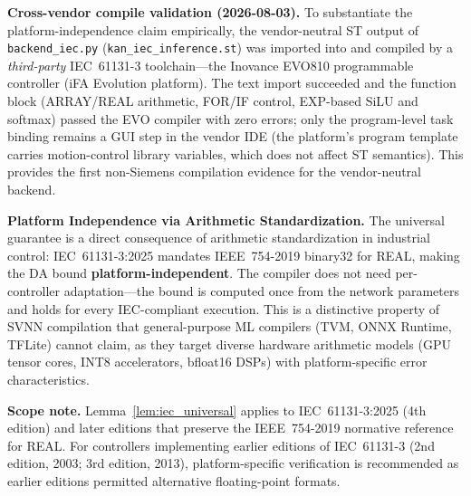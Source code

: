 \vspace{4pt}
\noindent\textbf{Cross-vendor compile validation (2026-08-03).} To
substantiate the platform-independence claim empirically, the
vendor-neutral ST output of \texttt{backend\_iec.py}
(\texttt{kan\_iec\_inference.st}) was imported into and compiled by a
\emph{third-party} IEC~61131-3 toolchain---the Inovance EVO810
programmable controller (iFA Evolution platform). The text import
succeeded and the function block (ARRAY/REAL arithmetic, FOR/IF
control, EXP-based SiLU and softmax) passed the EVO compiler with zero
errors; only the program-level task binding remains a GUI step in the
vendor IDE (the platform's program template carries motion-control
library variables, which does not affect ST semantics). This provides
the first non-Siemens compilation evidence for the vendor-neutral
backend.

\vspace{4pt}
\noindent\textbf{Platform Independence via Arithmetic Standardization.}
The universal guarantee is a direct consequence of arithmetic
standardization in industrial control: IEC~61131-3:2025 mandates
IEEE~754-2019 binary32 for REAL, making the DA bound
\textbf{platform-independent}. The compiler does not need per-controller
adaptation---the bound is computed once from the network parameters and
holds for every IEC-compliant execution. This is a distinctive property
of SVNN compilation that general-purpose ML compilers (TVM, ONNX
Runtime, TFLite) cannot claim, as they target diverse hardware
arithmetic models (GPU tensor cores, INT8 accelerators, bfloat16 DSPs)
with platform-specific error characteristics.

\vspace{4pt}
\noindent\textbf{Scope note.} Lemma~\ref{lem:iec_universal} applies to
IEC~61131-3:2025 (4th edition) and later editions that preserve the
IEEE~754-2019 normative reference for REAL. For controllers implementing
earlier editions of IEC~61131-3 (2nd edition, 2003; 3rd edition, 2013),
platform-specific verification is recommended as earlier editions
permitted alternative floating-point formats.
